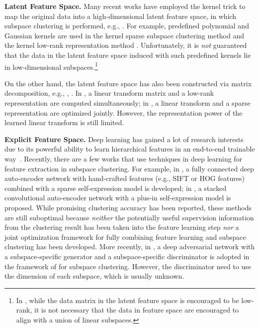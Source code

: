 \documentclass[10pt,twocolumn,letterpaper]{article}
\def\eg{e.g.}
\newcommand{\myparagraph}[1]{\smallskip\noindent\textbf{#1.}}
\def\eg{e.g.}
\begin{document}
\myparagraph{Latent Feature Space} Many recent works have employed the kernel trick to map the original data into a high-dimensional latent feature space, in which subspace clustering is performed, \eg, \cite{Patel:ICIP14, Patel:JSTSP15, Ngu:Neuc15, Xiao:TNNLS16}. For example, predefined polynomial and Gaussian kernels are used in the kernel sparse subspace clustering method \cite{Patel:ICIP14, Patel:JSTSP15} and the kernel low-rank representation method \cite{Ngu:Neuc15, Xiao:TNNLS16, Ji:AdaLRK-arXiv17}. Unfortunately, it is {\em not} guaranteed that the data in the latent feature space induced with such predefined kernels lie in low-dimensional subspaces.\footnote{In \cite{Ji:AdaLRK-arXiv17}, while the data matrix in the latent feature space is encouraged to be low-rank, it is not necessary that the data in feature space are encouraged to align with a union of linear subspaces.}




On the other hand, the latent feature space has also been constructed via matrix decomposition, \eg, \cite{Liu:ICCV11}, \cite{Patel:ICCV13}. In \cite{Liu:ICCV11}, a linear transform matrix and a low-rank representation are computed simultaneously; in \cite{Patel:ICCV13}, a linear transform and a sparse representation are optimized jointly. However, the representation power of the learned linear transform is still limited.


\myparagraph{Explicit Feature Space} Deep learning has gained a lot of research interests due to its powerful ability to learn hierarchical features in an end-to-end trainable way~\cite{Hinton:ISPM12, Krizhevsky:NIPS2012}. Recently, there are a few works that use techniques in deep learning for feature extraction in subspace clustering. For example, in \cite{Peng:IJCAI16,Peng:arxiv17}, a fully connected deep auto-encoder network with hand-crafted features (\eg, SIFT or HOG features) combined with a sparse self-expression model is developed; in \cite{Ji:NIPS17}, a stacked convolutional auto-encoder network with a plus-in self-expression model is proposed. While promising clustering accuracy has been reported, these methods are still suboptimal because \emph{neither} the potentially useful supervision information from the clustering result has been taken into the feature learning step \emph{nor} a joint optimization framework for fully combining feature learning and subspace clustering has been developed. More recently, in \cite{Zhou:CVPR18}, a deep adversarial network with a subspace-specific generator and a subspace-specific discriminator is adopted in the framework of \cite{Ji:NIPS17} for subspace clustering. However, the discriminator need to use the dimension of each subspace, which is usually unknown.
\end{document}

